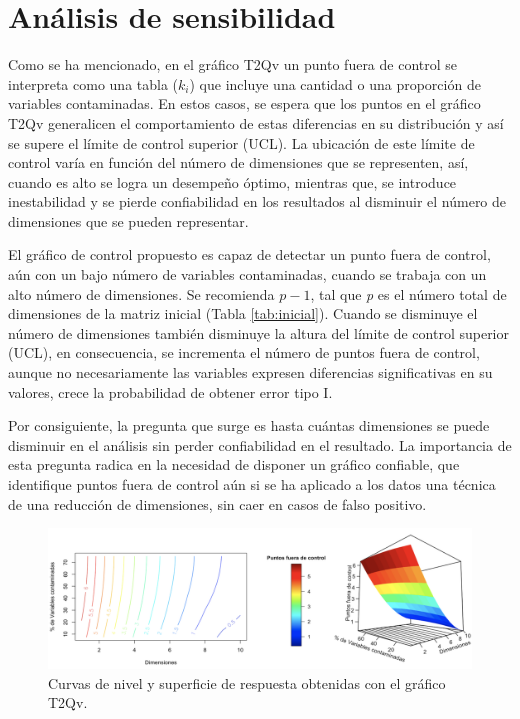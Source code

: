 \documentclass[mathematics,article,submit,moreauthors,pdftex]{mdpi}
\begin{document}
\hypertarget{anuxe1lisis-de-sensibilidad}{%
\section{Análisis de sensibilidad}\label{anuxe1lisis-de-sensibilidad}}

Como se ha mencionado, en el gráfico T2Qv un punto fuera de control se
interpreta como una tabla (\(k_i\)) que incluye una cantidad o una
proporción de variables contaminadas. En estos casos, se espera que los
puntos en el gráfico T2Qv generalicen el comportamiento de estas
diferencias en su distribución y así se supere el límite de control
superior (UCL). La ubicación de este límite de control varía en función
del número de dimensiones que se representen, así, cuando es alto se
logra un desempeño óptimo, mientras que, se introduce inestabilidad y se
pierde confiabilidad en los resultados al disminuir el número de
dimensiones que se pueden representar.

El gráfico de control propuesto es capaz de detectar un punto fuera de
control, aún con un bajo número de variables contaminadas, cuando se
trabaja con un alto número de dimensiones. Se recomienda \(p - 1\), tal
que \emph{p} es el número total de dimensiones de la matriz inicial
(Tabla \ref{tab:inicial}). Cuando se disminuye el número de dimensiones
también disminuye la altura del límite de control superior (UCL), en
consecuencia, se incrementa el número de puntos fuera de control, aunque
no necesariamente las variables expresen diferencias significativas en
su valores, crece la probabilidad de obtener error tipo I.

Por consiguiente, la pregunta que surge es hasta cuántas dimensiones se
puede disminuir en el análisis sin perder confiabilidad en el resultado.
La importancia de esta pregunta radica en la necesidad de disponer un
gráfico confiable, que identifique puntos fuera de control aún si se ha
aplicado a los datos una técnica de una reducción de dimensiones, sin
caer en casos de falso positivo.

\begin{figure}[H]


\begin{center}\includegraphics[width=0.9\linewidth,]{sensibilidad} \end{center}

\caption{Curvas de nivel y superficie de respuesta obtenidas con el gráfico T2Qv.}
\label{fig:sensibilidad}
\end{figure}
\end{document}

